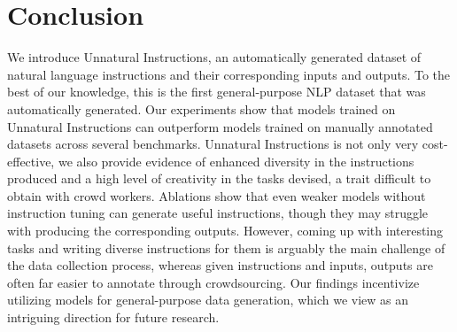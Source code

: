 \section{Conclusion}
We introduce Unnatural Instructions, an automatically generated dataset of natural language instructions and their corresponding inputs and outputs. To the best of our knowledge, this is the first general-purpose NLP dataset that was automatically generated. Our experiments show that models trained on Unnatural Instructions can outperform models trained on manually annotated datasets across several benchmarks. Unnatural Instructions is not only very cost-effective, we also provide evidence of enhanced diversity in the instructions produced and a high level of creativity in the tasks devised, a trait difficult to obtain with crowd workers. Ablations show that even weaker models without instruction tuning can generate useful instructions, though they may struggle with producing the corresponding outputs. However, coming up with interesting tasks and writing diverse instructions for them is arguably the main challenge of the data collection process, whereas given instructions and inputs, outputs are often far easier to annotate through crowdsourcing. Our findings incentivize utilizing models for general-purpose data generation, which we view as an intriguing direction for future research.


